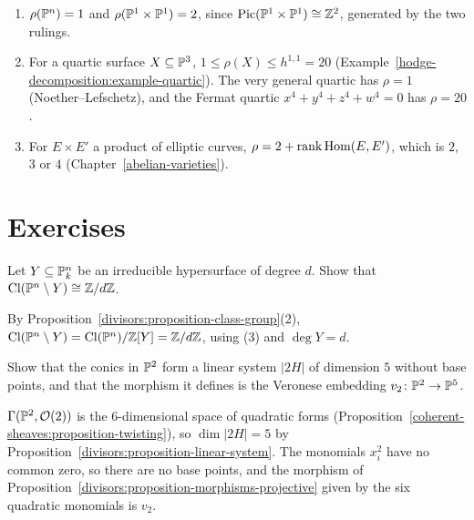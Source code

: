 \begin{example}\label{divisors:example-picard-numbers}
\begin{enumerate}
\item $\rho(\mathbb{P}^n) = 1$ and $\rho(\mathbb{P}^1 \times \mathbb{P}^1) = 2$, since $\operatorname{Pic}(\mathbb{P}^1 \times \mathbb{P}^1) \cong \mathbb{Z}^2$, generated by the two rulings.
\item For a quartic surface $X \subseteq \mathbb{P}^3$, $1 \leq \rho(X) \leq h^{1,1} = 20$ (Example~\ref{hodge-decomposition:example-quartic}). The very general quartic has $\rho = 1$
(Noether--Lefschetz), and the Fermat quartic $x^4 + y^4 + z^4 + w^4 = 0$ has $\rho = 20$.
\item For $E \times E'$ a product of elliptic curves, $\rho = 2 + \operatorname{rank}\operatorname{Hom}(E, E')$, which is $2$, $3$ or $4$ (Chapter~\ref{abelian-varieties}).
\end{enumerate}
\end{example}

\section{Exercises}\label{divisors:section-exercises}

\begin{exercise}\label{divisors:exercise-cl-minus-hypersurface}
Let $Y \subseteq \mathbb{P}^n_k$ be an irreducible hypersurface of degree $d$. Show that $\mathrm{Cl}(\mathbb{P}^n \setminus Y) \cong \mathbb{Z}/d\mathbb{Z}$.
\end{exercise}

\begin{solution}
By Proposition~\ref{divisors:proposition-class-group}(2), $\mathrm{Cl}(\mathbb{P}^n \setminus Y) = \mathrm{Cl}(\mathbb{P}^n)/\mathbb{Z}[Y] = \mathbb{Z}/d\mathbb{Z}$, using (3) and $\deg Y = d$.
\end{solution}

\begin{exercise}\label{divisors:exercise-linear-system-conics}
Show that the conics in $\mathbb{P}^2$ form a linear system $|2H|$ of dimension $5$ without base points, and that the morphism it defines is the Veronese embedding
$v_2 \colon \mathbb{P}^2 \to \mathbb{P}^5$.
\end{exercise}

\begin{solution}
$\Gamma(\mathbb{P}^2, \mathcal{O}(2))$ is the $6$-dimensional space of quadratic forms (Proposition~\ref{coherent-sheaves:proposition-twisting}), so $\dim|2H| = 5$ by
Proposition~\ref{divisors:proposition-linear-system}. The monomials $x_i^2$ have no common zero, so there are no base points, and the morphism of
Proposition~\ref{divisors:proposition-morphisms-projective} given by the six quadratic monomials is $v_2$.
\end{solution}

